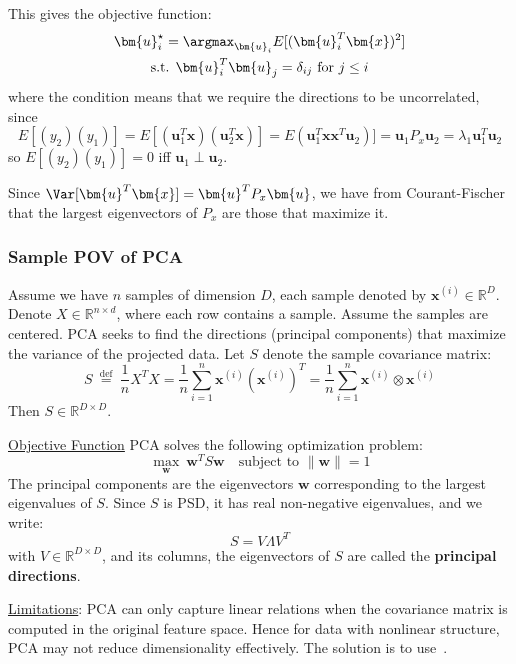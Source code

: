 \documentclass{article}
\begin{document}
This gives the objective function:
\begin{gather*}
  \bm{u}_{i} ^{\star} = \argmax_{\bm{u}_i} E[(\bm{u}_i ^{T} \bm{x})^2]   \\
  \text{s.t. } \bm{u}_i ^{T} \bm{u}_{j} = \delta_{ij} \text{ for } j \leq i
\end{gather*}
where the condition means that we require the directions to be uncorrelated, 
since
\[
  E[(y_2)(y_1)]  = E[(\bm{u}_1 ^{T} \bm{x})(\bm{u}_2^{T} \bm{x})] = E(\bm{u}_1^{T} \bm{x} \bm{x} ^{T} \bm{u}_2)] = \bm{u}_1 P_{x} \bm{u}_2 = \lambda_1 \bm{u}_1 ^{T} \bm{u}_2
\]
so $E[(y_2)(y_1)]= 0$ iff $\bm{u}_1 \perp \bm{u}_2$. 

Since $\Var[\bm{u}^{T} \bm{x}] = \bm{u}^{T} P_{x} \bm{u}$, we have from Courant-Fischer that the largest eigenvectors of $P_{x}$ are those that maximize it. 


\subsubsection{Sample POV of PCA}

Assume we have $n$ samples of dimension $D$, each sample denoted by $\bm{x}^{(i)} \in \mathbb{R}^{D}$. 
Denote $X \in \mathbb{R}^{n \times d}$, where each row contains a sample. Assume the samples are centered. 
PCA seeks to find the directions (principal components) that maximize the variance of the projected data.
Let $S$ denote the sample covariance matrix:
\[
S \stackrel{\text{ def }}{=} \frac{1}{n} X^T X = \frac{1}{n} \sum_{i=1}^{n} \bm{x}^{(i)} (\bm{x}^{(i)})^{T} = \frac{1}{n} \sum_{i=1}^{n} \bm{x}^{(i)} \otimes  \bm{x}^{(i)}
\]
Then $S \in \mathbb{R}^{D \times D}$.

\ul{Objective Function} PCA solves the following optimization problem:
\[
  \max_{\bm{w}} \ \bm{w}^{T} S \bm{w} \quad \text{subject to } \lVert \bm{w} \rVert =1
\]
The principal components are the eigenvectors $\bm{w}$ corresponding to the largest eigenvalues of $S$. Since $S$ is PSD, it has real non-negative eigenvalues, and we write:
\[
  S = V \Lambda V^{T}
\]
with $V \in \mathbb{R}^{D \times D}$, and its columns, the eigenvectors of $S$ are called the \textbf{principal directions}. 
 

\ul{Limitations}: PCA can only capture linear relations when the covariance matrix is computed in the original feature space. Hence for data with nonlinear structure, PCA may not reduce dimensionality effectively. The solution is to use~. 
\end{document}
